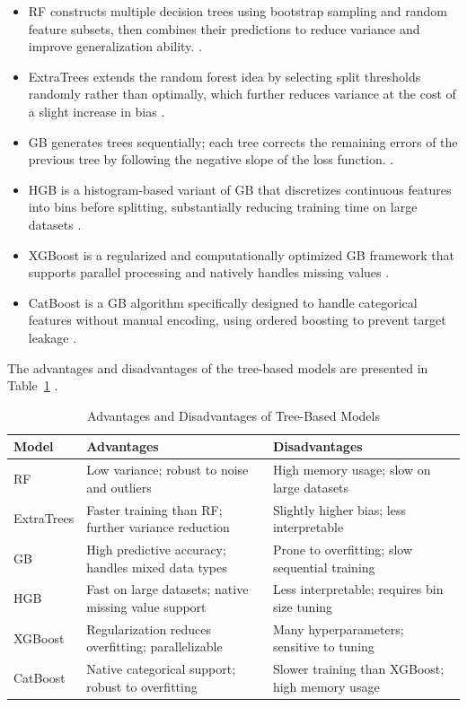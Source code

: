 \documentclass[final, 9pt, twocolumn]{saucis}
\begin{document}
\begin{itemize}
    \item RF constructs multiple decision trees using bootstrap sampling and random feature subsets, then combines their predictions to reduce variance and improve generalization ability. \cite{method10}.

    \item ExtraTrees extends the random forest idea by 
    selecting split thresholds randomly rather than optimally, which 
    further reduces variance at the cost of a slight increase in bias 
    \cite{method11}.

    \item GB generates trees sequentially; each tree corrects the remaining errors of the previous tree by following the negative slope of the loss function.
    \cite{method10}.

    \item HGB is a histogram-based variant 
    of GB that discretizes continuous features into bins 
    before splitting, substantially reducing training time on large 
    datasets \cite{method10}.

    \item XGBoost is a regularized and computationally 
    optimized GB framework that supports parallel 
    processing and natively handles missing values \cite{method10}.

    \item CatBoost is a GB algorithm 
    specifically designed to handle categorical features without manual encoding, using ordered boosting to prevent target leakage 
    \cite{method12}.
\end{itemize}

The advantages and disadvantages of the tree-based models are presented in Table~\ref{tab:tree_pros_cons} .

\begin{table}[htbp]
\centering
\caption{Advantages and Disadvantages of Tree-Based Models}
\label{tab:tree_pros_cons}
\small
\begin{tabular}{p{1.2cm} p{3.15cm} p{3.15cm}}
\hline
Model & Advantages & Disadvantages \\
\hline
RF
& Low variance; robust to noise and outliers
& High memory usage; slow on large datasets \\
ExtraTrees
& Faster training than RF; further variance reduction
& Slightly higher bias; less interpretable \\
GB & High predictive accuracy; handles mixed data types
& Prone to overfitting; slow sequential training \\
HGB
& Fast on large datasets; native missing value support
& Less interpretable; requires bin size tuning \\
XGBoost
& Regularization reduces overfitting; parallelizable
& Many hyperparameters; sensitive to tuning \\
CatBoost
& Native categorical support; robust to overfitting
& Slower training than XGBoost; high memory usage \\
\hline
\end{tabular}
\end{table}
\end{document}
